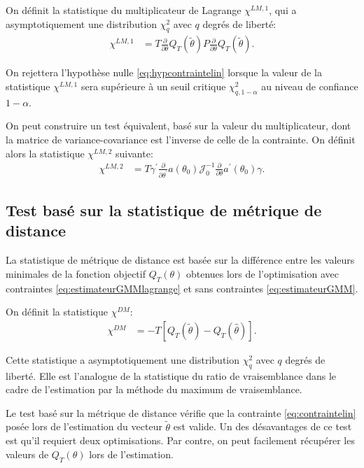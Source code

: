 On définit la statistique du multiplicateur de Lagrange $\chi^{LM,1}$,
qui a asymptotiquement une distribution $\chi^2_q$ avec $q$ degrés de
liberté:
\begin{align}
  \label{statistiqueLM}
  \chi^{LM,1} &= T \frac{\partial}{\partial\theta}Q_T(\tilde\theta) P
  \frac{\partial}{\partial\theta}Q_T(\tilde\theta).
\end{align}

On rejettera l'hypothèse nulle \eqref{eq:hypcontraintelin} lorsque la
valeur de la statistique $\chi^{LM,1}$ sera supérieure à un seuil
critique $\chi_{q,1-\alpha}^2$ au niveau de confiance $1-\alpha$.

On peut construire un test équivalent, basé sur la valeur du
multiplicateur, dont la matrice de variance-covariance est l'inverse
de celle de la contrainte. On définit alors la statistique
$\chi^{LM,2}$ suivante:
\begin{align}
  \label{eq:statistiqueLM2}
  \chi^{LM,2} &= T \gamma^{\prime}
  \frac{\partial}{\partial\theta^{\prime}} a(\theta_0)
  \mathcal{J}_0^{-1}
  \frac{\partial}{\partial\theta}a^{\prime}(\theta_0) \gamma.
\end{align}

\subsection{Test basé sur la statistique de métrique de distance}

La statistique de métrique de distance est basée sur la différence
entre les valeurs minimales de la fonction objectif $Q_T(\theta)$
obtenues lors de l'optimisation avec contraintes
\eqref{eq:estimateurGMMlagrange} et sans contraintes
\eqref{eq:estimateurGMM}.

On définit la statistique $\chi^{DM}$:
\begin{align}
  \label{statistiqueD}
  \chi^{DM} &= -T \left[Q_T(\tilde\theta) - Q_T(\hat\theta)\right].
\end{align}

Cette statistique a asymptotiquement une distribution $\chi^2_q$ avec
$q$ degrés de liberté. Elle est l'analogue de la statistique du ratio
de vraisemblance dans le cadre de l'estimation par la méthode du
maximum de vraisemblance.

Le test basé sur la métrique de distance vérifie que la contrainte
\eqref{eq:contraintelin} posée lors de l'estimation du vecteur
$\tilde\theta$ est valide. Un des désavantages de ce test est qu'il
requiert deux optimisations. Par contre, on peut facilement récupérer
les valeurs de $Q_T(\theta)$ lors de l'estimation.

